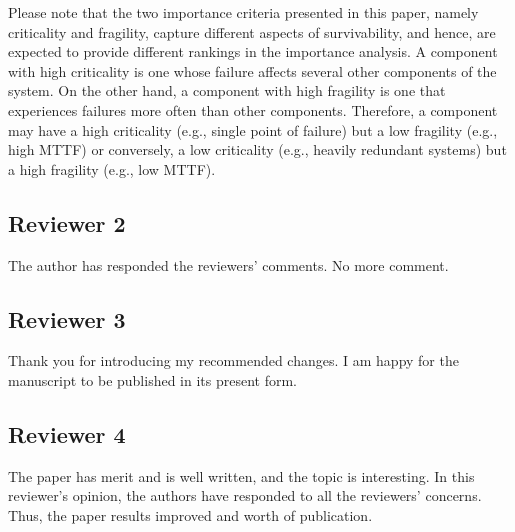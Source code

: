 \documentclass{article}
\newenvironment{response}{
  \doublespacing
  \setlength\parindent{0.05\linewidth}
  \ttfamily
}{}
\begin{document}
\begin{response}
Please note that the two importance criteria presented in this paper, namely criticality and fragility, capture different aspects of survivability, and hence, are expected to provide different rankings in the importance analysis. A component with high criticality is one whose failure affects several other components of the system. On the other hand, a component with high fragility is one that experiences failures more often than other components. Therefore, a component may have a high criticality (e.g., single point of failure) but a low fragility (e.g., high MTTF) or conversely, a low criticality (e.g., heavily redundant systems) but a high fragility (e.g., low MTTF).

\end{response}

\subsection{Reviewer 2}
\label{sec:reviewer:r2}
The author has responded the reviewers' comments. No more comment.

\subsection{Reviewer 3}
\label{sec:reviewer:r3}
Thank you for introducing my recommended changes. I am happy for the manuscript to be published in its present form.

\subsection{Reviewer 4}
\label{sec:reviewer:r4}
The paper has merit and is well written, and the topic is interesting. In this reviewer's opinion, the authors have responded to all the reviewers' concerns. Thus, the paper results improved and worth of publication.
\end{document}
